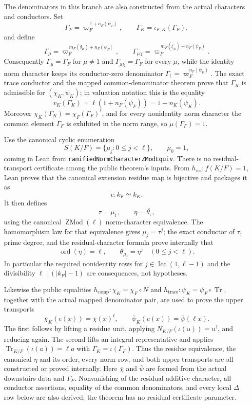\begin{theorem}
The denominators in this branch are also constructed from the actual
characters and conductors.  Set
\[
 \Gamma_F=\varpi_F^{\,1+n_F(\psi_F)},\qquad
 \Gamma_K=\iota_{F,K}(\Gamma_F),
\]
and define
\[
 \Gamma_\mu=\varpi_F^{\,m_F(\theta_\mu)+n_F(\psi_F)},\qquad
 \Gamma_{\mu\chi}
   =\varpi_F^{\,m_F(\xi_\mu)+n_F(\psi_F)}.
\]
Consequently $\Gamma_\mu=\Gamma_F$ for $\mu\ne1$ and
$\Gamma_{\mu\chi}=\Gamma_F$ for every $\mu$, while the identity norm
character keeps its conductor-zero denominator
$\Gamma_1=\varpi_F^{n_F(\psi_F)}$.  The exact trace conductor and the
mapped common-denominator theorem prove that $\Gamma_K$ is admissible for
$(\chi_K,\psi_K)$; in valuation notation this is the equality
\[
 v_K(\Gamma_K)=\ell(1+n_F(\psi_F))
              =1+n_K(\psi_K).
\]
Moreover $\chi_K(\Gamma_K)=\chi_F(\Gamma_F)^\ell$, and for every
nonidentity norm character the common element $\Gamma_F$ is exhibited in
the norm range, so $\mu(\Gamma_F)=1$.

Use the canonical cyclic enumeration
\[
 S(K/F)=\{\mu_j:0\leq j<\ell\},\qquad \mu_0=1,
\]
coming in Lean from \texttt{ramifiedNormCharacterZModEquiv}.  There is no
residual-transport certificate among the public theorem's inputs.  From
$h_{\mathrm{res}}:f(K/F)=1$, Lean proves that the canonical extension
residue map is bijective and packages it as
\[
 e:k_F\simeq k_K.
\]
It then defines
\[
 \tau=\mu_1,\qquad
 \eta=\overline{\theta_\tau},
\]
using the canonical $\operatorname{ZMod}(\ell)$ norm-character
equivalence.  The homomorphism law for that equivalence gives
$\mu_j=\tau^j$; the exact conductor of $\tau$, prime degree, and the
residual-character formula prove internally that
\[
 \operatorname{ord}(\eta)=\ell,\qquad
 \overline{\theta_{\mu_j}}=\eta^j
 \quad(0\leq j<\ell).
\]
In particular the required nonidentity rows for
$j\in\operatorname{Icc}(1,\ell-1)$ and the divisibility
$\ell\mid(|k_F|-1)$ are consequences, not hypotheses.

Likewise the public equalities
$h_{\mathrm{comp}}:\chi_K=\chi_F\circ N$ and
$h_{\mathrm{trace}}:\psi_K=\psi_F\circ\operatorname{Tr}$, together with
the actual mapped denominator pair, are used to prove the upper transports
\[
 \bar\chi_K(e(x))=\bar\chi(x)^\ell,\qquad
 \bar\psi_K(e(x))=\bar\psi(\ell x).
\]
The first follows by lifting a residue unit, applying
$N_{K/F}(\iota(u))=u^\ell$, and reducing again.  The second lifts an
integral representative and applies
$\operatorname{Tr}_{K/F}(\iota(a))=\ell a$ with
$\Gamma_K=\iota(\Gamma_F)$.  Thus the residue equivalence, the canonical
$\eta$ and its order, every norm row, and both upper transports are all
constructed or proved internally.  Here $\bar\chi$ and $\bar\psi$ are
formed from the actual downstairs data and $\Gamma_F$.  Nonvanishing of
the residual additive character, all conductor assertions, equality of
the common denominators, and every local $\Delta$ row below are also
derived; the theorem has no residual certificate parameter.


\end{theorem}
